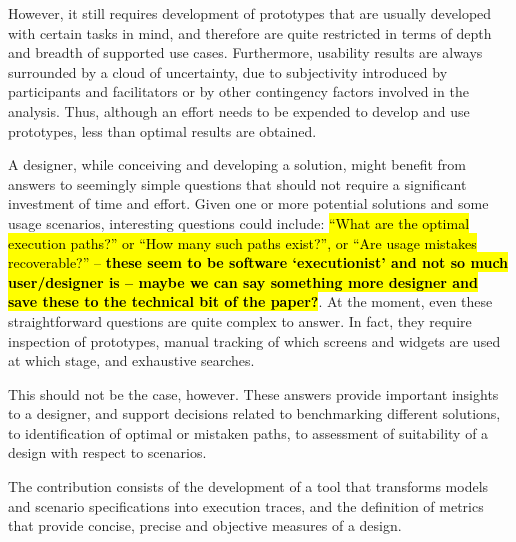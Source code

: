 \documentclass{sigchi}
\begin{document}
However, it still requires development of prototypes that are usually
developed with certain tasks in mind, and therefore are quite
restricted in terms of depth and breadth of supported use
cases. Furthermore, usability results are always surrounded by a cloud
of uncertainty, due to subjectivity introduced by participants and
facilitators or by other contingency factors involved in the
analysis. Thus, although an effort needs to be expended to develop and
use prototypes, less than optimal results are obtained.

A designer, while conceiving and developing a solution, might benefit
from answers to seemingly simple questions that should not require a
significant investment of time and effort. Given one or more potential
solutions and some usage scenarios, interesting questions could
include: \hl{``What are the optimal execution paths?'' or ``How many such
paths exist?'', or ``Are usage mistakes recoverable?'' -- \textbf{these seem to be software `executionist' and not so much user/designer is -- maybe we can say something more designer and save these to the technical bit of the paper?}}. At the moment,
even these straightforward questions are quite complex to answer. In
fact, they require inspection of prototypes, manual tracking of which
screens and widgets are used at which stage, and exhaustive searches.

This should not be the case, however. These answers provide important
insights to a designer, and support decisions related to benchmarking
different solutions, to identification of optimal or mistaken paths,
to assessment of suitability of a design with respect to scenarios.

The contribution consists of the development of a tool that transforms
models and scenario specifications into execution traces, and the
definition of metrics that provide concise, precise and objective
measures of a design.



\end{document}
